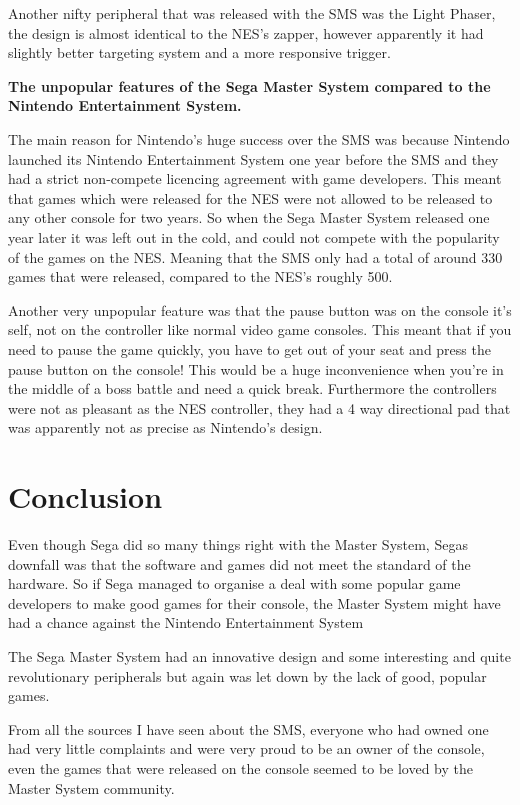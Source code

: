 \documentclass{scrartcl}
\begin{document}
Another nifty peripheral that was released with the SMS was the Light Phaser, the design is almost identical to the NES's zapper, however apparently it had slightly better targeting system and a more responsive trigger. 


\textbf{The unpopular features of the Sega Master System compared to the Nintendo Entertainment System.} \par

The main reason for Nintendo’s huge success over the SMS was because Nintendo launched its Nintendo Entertainment System one year before the SMS and they had a strict non-compete licencing agreement with game developers. This meant that games which were released for the NES were not allowed to be released to any other console for two years.\cite{Weiss2009} So when the Sega Master System released one year later it was left out in the cold, and could not compete with the popularity of the games on the NES. Meaning that the SMS only had a total of around 330 games that were released, compared to the NES's roughly 500. \cite{russell}

Another very unpopular feature was that the pause button was on the console it's self, not on the controller like normal video game consoles. This meant that if you need to pause the game quickly, you have to get out of your seat and press the pause button on the console! This would be a huge inconvenience when you're in the middle of a boss battle and need a quick break. Furthermore the controllers were not as pleasant as the NES controller, they had a 4 way directional pad that was apparently not as precise as Nintendo’s design.\cite{Weiss2009}




\section{Conclusion}



Even though Sega did so many things right with the Master System, Segas downfall was that the software and games did not meet the standard of the hardware. So if Sega managed to organise a deal with some popular game developers to make good games for their console, the Master System might have had a chance against the Nintendo Entertainment System

The Sega Master System had an innovative design and some interesting and quite revolutionary peripherals but again was let down by the lack of good, popular games. 

From all the sources I have seen about the SMS, everyone who had owned one had very little complaints and were very proud to be an owner of the console, even the games that were released on the console seemed to be loved by the Master System community.





\end{document}
